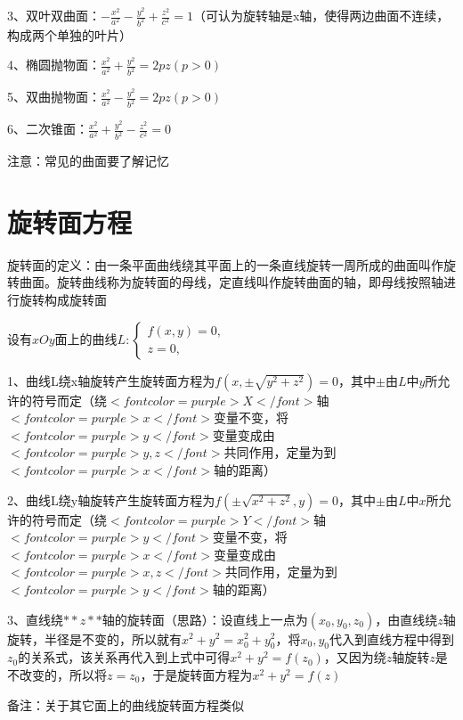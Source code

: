 3、双叶双曲面：$ -\frac{x^{2}}{a^{2}}-\frac{y^{2}}{b^{2}}+\frac{z^{2}}{c^{2}}=1 $（可认为旋转轴是x轴，使得两边曲面不连续，构成两个单独的叶片）

4、椭圆抛物面：$ \frac{x^{2}}{a^{2}}+\frac{y^{2}}{b^{2}}=2 p z(p>0) $

5、双曲抛物面：$ \frac{x^{2}}{a^{2}}-\frac{y^{2}}{b^{2}}=2 p z(p>0) $

6、二次锥面：$ \frac{x^{2}}{a^{2}}+\frac{y^{2}}{b^{2}}-\frac{z^{2}}{c^{2}}=0 $

注意：常见的曲面要了解记忆

\section{旋转面方程}

旋转面的定义：由一条平面曲线绕其平面上的一条直线旋转一周所成的曲面叫作旋转曲面。旋转曲线称为旋转面的母线，定直线叫作旋转曲面的轴，即母线按照轴进行旋转构成旋转面

设有$ x O y $面上的曲线$ L:\left\{\begin{array}{l}f(x, y)=0, \\ z=0,\end{array}\right. $

1、曲线L绕x轴旋转产生旋转面方程为$ f\left(x, \pm \sqrt{y^{2}+z^{2}}\right)=0 $，其中$ \pm $由$ L $中$ y $所允许的符号而定（绕$ <font color=purple>X</font> $轴$ <font color=purple>x</font> $变量不变，将$ <font color=purple>y</font> $变量变成由$ <font color=purple>y,z</font> $共同作用，定量为到$ <font color=purple>x</font> $轴的距离）

2、曲线L绕y轴旋转产生旋转面方程为$ f\left(\pm \sqrt{x^{2}+z^{2}}, y\right)=0 $，其中$ \pm $由$ L $中$ x $所允许的符号而定（绕$ <font color=purple>Y</font> $轴$ <font color=purple>y</font> $变量不变，将$ <font color=purple>x</font> $变量变成由$ <font color=purple>x,z</font> $共同作用，定量为到$ <font color=purple>y</font> $轴的距离）

3、直线绕$ **z** $轴的旋转面（思路）：设直线上一点为$ \left(x_{0}, y_{0}, z_{0}\right) $，由直线绕$ z $轴旋转，半径是不变的，所以就有$ x^2+y^2 = x_{0}^2+y_{0}^2 $，将$ x_{0}, y_{0} $代入到直线方程中得到$ z_{0} $的关系式，该关系再代入到上式中可得$ x^2+y^2 = f(z_{0}) $，又因为绕$ z $轴旋转$ z $是不改变的，所以将$ z=z_{0} $，于是旋转面方程为$ x^2+y^2 = f(z) $

备注：关于其它面上的曲线旋转面方程类似


